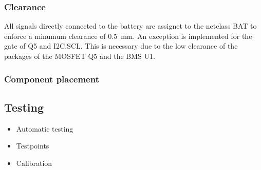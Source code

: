 \FloatBarrier

\subsubsection{Clearance}
\label{sec_layout_cleraance}
All signals directly connected to the battery are assignet to the netclass BAT to enforce a minumum clearance of \qty{0.5}{\milli\meter}. An exception is implemented for the gate of Q5 and I2C.SCL. This is necessary due to the low clearance of the packages of the \ac{MOSFET} Q5 and the \ac{BMS} U1. 

\FloatBarrier

\subsubsection{Component placement}
\label{sec_layout_placement}

\FloatBarrier

\subsection{Testing}
\label{sec_testing}
\begin{itemize}
    \item Automatic testing
    \item Testpoints
    \item Calibration
\end{itemize}

\FloatBarrier
